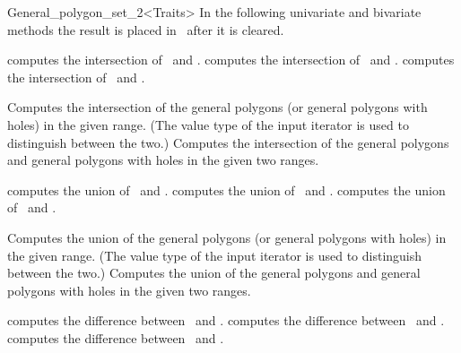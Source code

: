 \begin{ccRefClass}{General_polygon_set_2<Traits>}
In the following univariate and bivariate methods the result is placed in
\ccVar\ after it is cleared.

  {computes the intersection of \ccVar\ and .}
\ccGlue
{}
  {computes the intersection of \ccVar\ and .}
\ccGlue
{}
  {computes the intersection of \ccVar\ and .}

  {Computes the intersection of the general polygons (or general
  polygons with holes) in the given range. (The value type of the
  input iterator is used to distinguish between the two.)}
\ccGlue
{}
{Computes the intersection of the general polygons and general polygons
with holes in the given two ranges.}

  {computes the union of \ccVar\ and .}
\ccGlue
{}
  {computes the union of \ccVar\ and .}
\ccGlue
{}
  {computes the union of \ccVar\ and .}

  {Computes the union of the general polygons (or general
  polygons with holes) in the given range. (The value type of the
  input iterator is used to distinguish between the two.)}
\ccGlue
{}
{Computes the union of the general polygons and general polygons
with holes in the given two ranges.}

  {computes the difference between \ccVar\ and .}
\ccGlue
{}
  {computes the difference between \ccVar\ and .}
\ccGlue
{}
  {computes the difference between \ccVar\ and .}


\end{ccRefClass}
